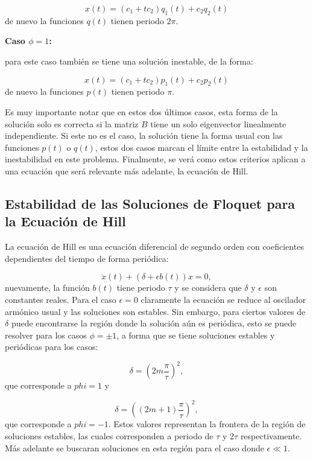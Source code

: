 \documentclass[a4paper,10pt]{report}
\begin{document}
\begin{equation}
x(t) = (c_1 + tc_2)q_1(t) + c_2q_2(t)
\end{equation} de nuevo la funciones $q(t)$ tienen periodo $2\pi$.

\textbf{Caso $\phi = 1$:}

para este caso también se tiene una solución inestable, de la forma:

\begin{equation}
x(t) = (c_1 + tc_2)p_1(t) + c_2p_2(t)
\end{equation} de nuevo la funciones $p(t)$ tienen periodo $\pi$.

Es muy importante notar que en estos dos últimos casos, esta forma de la solución solo es correcta si la matriz $B$ tiene un solo eigenvector linealmente independiente. Si este no es el caso, la solución tiene la forma usual con las funciones $p(t)$ o $q(t)$, estos dos casos marcan el límite entre la estabilidad y la inestabilidad en este problema. Finalmente, se verá como estos criterios aplican a una ecuación que será relevante más adelante, la ecuación de Hill.

\subsection{Estabilidad de las Soluciones de Floquet para la Ecuación de Hill}

La ecuación de Hill es una ecuación diferencial de segundo orden con coeficientes dependientes del tiempo de forma periódica\cite{WardFT}:

\begin{equation}
\ddot{x}(t) + (\delta + \epsilon b(t))x = 0,
\end{equation} nuevamente, la función $b(t)$ tiene periodo $\tau$ y se considera que $\delta$ y $\epsilon$ son constantes reales. Para el caso $\epsilon = 0$ claramente la ecuación se reduce al oscilador armónico usual y las soluciones son estables. Sin embargo, para ciertos valores de $\delta$ puede encontrarse la región donde la solución aún es periódica, esto se puede resolver para los casos $\phi = \pm 1$, a forma que se tiene soluciones estables y periódicas para los casos:

\begin{equation}
\delta = (2m\frac{\pi}{\tau})^2, 
\end{equation} que corresponde a $phi=1$ y

\begin{equation}
\delta = ((2m+1)\frac{\pi}{\tau})^2,
\end{equation} que corresponde a $phi=-1$. Estos valores representan la frontera de la región de soluciones estables, las cuales corresponden a periodo de $\tau$ y $2\tau$ respectivamente. Más adelante se buscaran soluciones en esta región para el caso donde $\epsilon \ll 1$.
\end{document}
